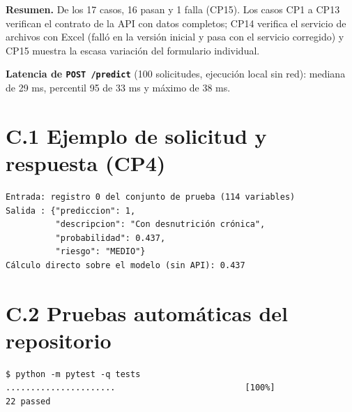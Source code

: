 \noindent\textbf{Resumen.} De los 17 casos, 16 pasan y 1 falla (CP15). Los casos CP1 a CP13 verifican el contrato de la API con datos completos; CP14 verifica el servicio de archivos con Excel (falló en la versión inicial y pasa con el servicio corregido) y CP15 muestra la escasa variación del formulario individual.

\noindent\textbf{Latencia de \texttt{POST /predict}} (100 solicitudes, ejecución local sin red): mediana de 29 ms, percentil 95 de 33 ms y máximo de 38 ms.

\section*{C.1 Ejemplo de solicitud y respuesta (CP4)}
\begin{lstlisting}[frame=single,basicstyle=\ttfamily\footnotesize]
Entrada: registro 0 del conjunto de prueba (114 variables)
Salida : {"prediccion": 1,
          "descripcion": "Con desnutrición crónica",
          "probabilidad": 0.437,
          "riesgo": "MEDIO"}
Cálculo directo sobre el modelo (sin API): 0.437
\end{lstlisting}

\section*{C.2 Pruebas automáticas del repositorio}
\begin{lstlisting}[frame=single,basicstyle=\ttfamily\footnotesize]
$ python -m pytest -q tests
......................                          [100%]
22 passed
\end{lstlisting}


